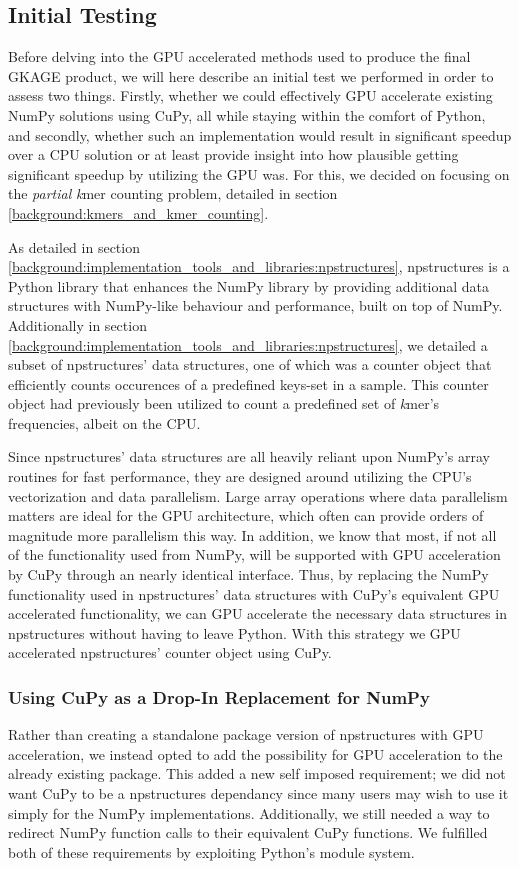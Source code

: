 \subsection{Initial Testing} \label{methods:initial_testing}
Before delving into the GPU accelerated methods used to produce the final GKAGE product, we will here describe an initial test we performed in order to assess two things. Firstly, whether we could effectively GPU accelerate existing NumPy solutions using CuPy, all while staying within the comfort of Python, and secondly, whether such an implementation would result in significant speedup over a CPU solution or at least provide insight into how plausible getting significant speedup by utilizing the GPU was.
For this, we decided on focusing on the \textit{partial} \textit{k}mer counting problem, detailed in section \ref{background:kmers_and_kmer_counting}.

As detailed in section \ref{background:implementation_tools_and_libraries:npstructures}, npstructures is a Python library that enhances the NumPy library by providing additional data structures with NumPy-like behaviour and performance, built on top of NumPy.
Additionally in section \ref{background:implementation_tools_and_libraries:npstructures}, we detailed a subset of npstructures' data structures, one of which was a counter object that efficiently counts occurences of a predefined keys-set in a sample.
This counter object had previously been utilized to count a predefined set of \textit{k}mer's frequencies, albeit on the CPU.

Since npstructures' data structures are all heavily reliant upon NumPy's array routines for fast performance, they are designed around utilizing the CPU's vectorization and data parallelism.
Large array operations where data parallelism matters are ideal for the GPU architecture, which often can provide orders of magnitude more parallelism this way.
In addition, we know that most, if not all of the functionality used from NumPy, will be supported with GPU acceleration by CuPy through an nearly identical interface.
Thus, by replacing the NumPy functionality used in npstructures' data structures with CuPy's equivalent GPU accelerated functionality, we can GPU accelerate the necessary data structures in npstructures without having to leave Python.
With this strategy we GPU accelerated npstructures' counter object using CuPy.

\subsubsection{Using CuPy as a Drop-In Replacement for NumPy} \label{methods:initial_testing:using_cupy_as_a_drop_in_replacement_for_numpy}
Rather than creating a standalone package version of npstructures with GPU acceleration, we instead opted to add the possibility for GPU acceleration to the already existing package.
This added a new self imposed requirement; we did not want CuPy to be a npstructures dependancy since many users may wish to use it simply for the NumPy implementations.
Additionally, we still needed a way to redirect NumPy function calls to their equivalent CuPy functions.
We fulfilled both of these requirements by exploiting Python's module system.

